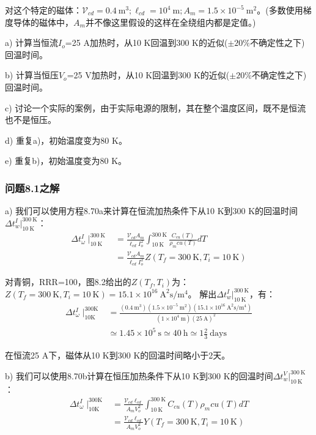 对这个特定的磁体：$\mathcal{V}_{cd}=0.4\ \mathrm{m^3};\ell_{cd}=10^4\ \mathrm{m};A_m=1.5\times 10^{-5}\ \mathrm{m^2}$。(多数使用梯度导体的磁体中，$A_m$并不像这里假设的这样在全绕组内都是定值。)

a) 计算当恒流$I_o$=25 A加热时，从10 K回温到300 K的近似($\pm 20\%$不确定性之下)回温时间。

b) 计算当恒压$V_o$=25 V加热时，从10 K回温到300 K的近似($\pm 20\%$不确定性之下)回温时间。

c) 讨论一个实际的案例，由于实际电源的限制，其在整个温度区间，既不是恒流也不是恒压。

d) 重复a)，初始温度变为80 K。

e) 重复b)，初始温度变为80 K。

\subsubsection{问题8.1之解}
a) 我们可以使用方程8.70a来计算在恒流加热条件下从10 K到300 K的回温时间$\Delta t_w^I|_{10\ \mathrm{K}}^{300\ \mathrm{K}}$：
\begin{align*}%
\Delta t_{\omega}^{I}\mid_{10\ \mathrm{K}}^{300\ \mathrm{K}}&=\frac{\mathcal{V}_{cd}A_m}{\ell_{cd}I_{o}^{2}}\int_{10\ \mathrm{K}}^{300\ \mathrm{K}}\frac{C_{cu}(T)}{\rho_m{cu}(T)}dT \\
&=\frac{\mathcal{V}_{cd}A_m}{\ell_{cd}I_{o}^{2}}Z(T_f=300\ \mathrm{K},T_i=10\ \mathrm{K}) \tag{S1.1}
\end{align*}

对青铜，RRR=100，图8.2给出的$Z(T_f,T_i)$为：
$Z(T_f=300\ \mathrm{K},T_i=10\ \mathrm{K})=15.1\times 10^{16}\ \mathrm{A^2 s/m^4}$。
解出$\Delta t_w^I|_{10\ \mathrm{K}}^{300\ \mathrm{K}}$，有：
\begin{align*}%
\Delta t_{\omega}^{I}\mid_{10\mathrm{K}}^{300\mathrm{K}}&=\frac{(0.4\ \mathrm{m^3})(1.5\times 10^{-5}\ \mathrm{m^2})(15.1\times 10^{16}\ \mathrm{A^2s/m^4})}{(1\times 10^4\ \mathrm{m})(25\ \mathrm{A})^2} \\
&\simeq 1.45\times 10^5\ \mathrm{s}\simeq 40\ \mathrm{h}\simeq 1\frac{2}{3}\ \mathrm{days}  \tag{S1.2}
\end{align*}

在恒流25 A下，磁体从10 K到300 K的回温时间略小于2天。

b) 我们可以使用8.70b计算在恒压加热条件下从10 K到300 K的回温时间$\Delta t_w^V|_{10\ \mathrm{K}}^{300\ \mathrm{K}}$：
\begin{align*}%
\Delta t_{\omega}^{I}\mid_{10\mathrm{K}}^{300\mathrm{K}}&=\frac{\mathcal{V}_{cd}\ell_{cd}}{A_mV_{o}^{2}}\int_{10\ \mathrm{K}}^{300\ \mathrm{K}}C_{cu}(T)\rho_m{cu}(T)dT \\
&=\frac{\mathcal{V}_{cd}\ell_{cd}}{A_mV_{o}^{2}}Y(T_f=300\ \mathrm{K},T_i=10\ \mathrm{K})\tag{S1.3}
\end{align*}

